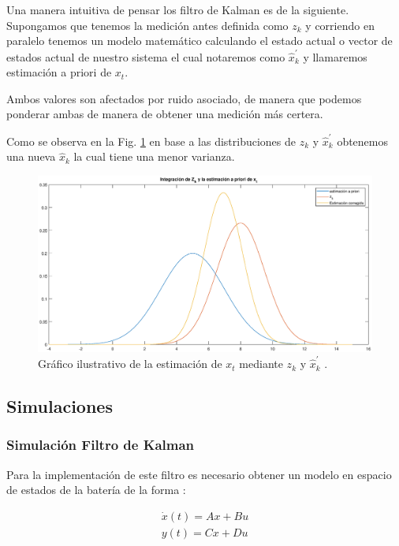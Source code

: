 \documentclass[10pt,a4paper]{article}
\begin{document}
Una manera intuitiva de pensar los filtro de Kalman es de la siguiente.
Supongamos que tenemos la medición antes definida como $z_k$ y corriendo en
paralelo tenemos un modelo matemático calculando el estado actual o vector de
estados actual de nuestro sistema el cual notaremos como $\hat{x}^\prime_k$ y
llamaremos estimación a priori de $x_{t}$.

Ambos valores son afectados por ruido asociado, de manera que podemos ponderar
ambas de manera de obtener una medición más certera.

Como se observa en la Fig. \ref{KF_Integration_concept} en base a las
distribuciones de $z_k$ y $\hat{x}^\prime_k$ obtenemos una nueva $\hat{x}_k$ la
cual tiene una menor varianza.

\begin{figure}[h!]
    \begin{center}
	\includegraphics[width=1\textwidth]{KF_Integration_concept.eps}
	\caption{Gráfico ilustrativo de la estimación de $x_{t}$ mediante $z_k$ y
	$\hat{x}^\prime_k$ .}
	\label{KF_Integration_concept}
    \end{center}
\end{figure}
\FloatBarrier

\subsection{Simulaciones}

\subsubsection{Simulación Filtro de Kalman}

Para la implementación de este filtro es necesario obtener un modelo en espacio
de estados de la batería de la forma :

\begin{align}
    \dot{x}(t) = Ax+Bu	\nonumber\\
    y(t)=Cx+Du
    \label{SS_Model_generic}	
\end{align}
\end{document}
